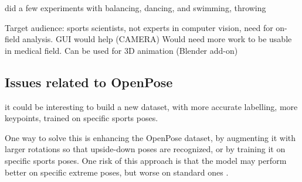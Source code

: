 did a few experiments with balancing, dancing, and swimming, throwing

Target audience: sports scientists, not experts in computer vision, need for on-field analysis. GUI would help (CAMERA)
Would need more work to be usable in medical field. Can be used for 3D animation (Blender add-on)


\subsection{Issues related to OpenPose}

it could be interesting to build a new dataset, with more accurate labelling, more keypoints, trained on specific sports poses.

One way to solve this is enhancing the OpenPose dataset, by augmenting it with larger rotations so that upside-down poses are recognized, or by training it on specific sports poses. One risk of this approach is that the model may perform better on specific extreme poses, but worse on standard ones \cite{Kitamura2022}. 

